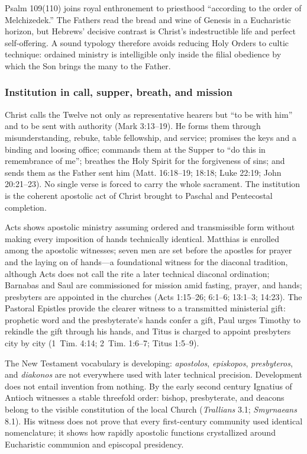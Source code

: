 Psalm 109(110) joins royal enthronement to priesthood ``according to the order of Melchizedek.'' The Fathers read the bread and wine of Genesis in a Eucharistic horizon, but Hebrews' decisive contrast is Christ's indestructible life and perfect self-offering. A sound typology therefore avoids reducing Holy Orders to cultic technique: ordained ministry is intelligible only inside the filial obedience by which the Son brings the many to the Father.

\subsubsection{Institution in call, supper, breath, and mission}

Christ calls the Twelve not only as representative hearers but ``to be with him'' and to be sent with authority (Mark 3:13--19). He forms them through misunderstanding, rebuke, table fellowship, and service; promises the keys and a binding and loosing office; commands them at the Supper to ``do this in remembrance of me''; breathes the Holy Spirit for the forgiveness of sins; and sends them as the Father sent him (Matt. 16:18--19; 18:18; Luke 22:19; John 20:21--23). No single verse is forced to carry the whole sacrament. The institution is the coherent apostolic act of Christ brought to Paschal and Pentecostal completion.

Acts shows apostolic ministry assuming ordered and transmissible form without making every imposition of hands technically identical. Matthias is enrolled among the apostolic witnesses; seven men are set before the apostles for prayer and the laying on of hands---a foundational witness for the diaconal tradition, although Acts does not call the rite a later technical diaconal ordination; Barnabas and Saul are commissioned for mission amid fasting, prayer, and hands; presbyters are appointed in the churches (Acts 1:15--26; 6:1--6; 13:1--3; 14:23). The Pastoral Epistles provide the clearer witness to a transmitted ministerial gift: prophetic word and the presbyterate's hands confer a gift, Paul urges Timothy to rekindle the gift through his hands, and Titus is charged to appoint presbyters city by city (1~Tim. 4:14; 2~Tim. 1:6--7; Titus 1:5--9).

The New Testament vocabulary is developing: \emph{apostolos}, \emph{episkopos}, \emph{presbyteros}, and \emph{diakonos} are not everywhere used with later technical precision. Development does not entail invention from nothing. By the early second century Ignatius of Antioch witnesses a stable threefold order: bishop, presbyterate, and deacons belong to the visible constitution of the local Church (\emph{Trallians} 3.1; \emph{Smyrnaeans} 8.1). His witness does not prove that every first-century community used identical nomenclature; it shows how rapidly apostolic functions crystallized around Eucharistic communion and episcopal presidency.

